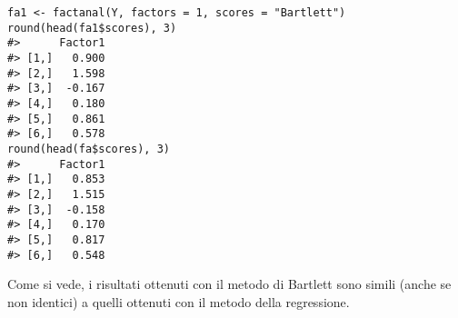 \begin{example}
\begin{lstlisting}
fa1 <- factanal(Y, factors = 1, scores = "Bartlett")
round(head(fa1$scores), 3)
#>      Factor1
#> [1,]   0.900
#> [2,]   1.598
#> [3,]  -0.167
#> [4,]   0.180
#> [5,]   0.861
#> [6,]   0.578
round(head(fa$scores), 3)
#>      Factor1
#> [1,]   0.853
#> [2,]   1.515
#> [3,]  -0.158
#> [4,]   0.170
#> [5,]   0.817
#> [6,]   0.548
\end{lstlisting}
Come si vede, i risultati ottenuti con il metodo di Bartlett sono simili (anche se non identici) a quelli ottenuti con il metodo della regressione.

\end{example}


%
%
%
%
%
%
